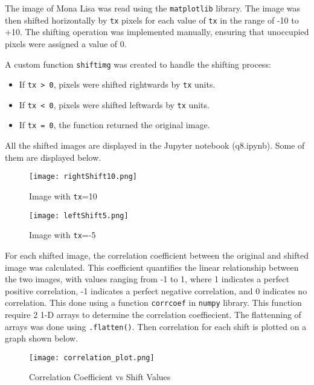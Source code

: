 \begin{tcolorbox}[breakable]
	\begin{sol}
		The image of Mona Lisa was read using the \texttt{matplotlib}
		library. The image was then shifted horizontally by \texttt{tx}
		pixels for each value of \texttt{tx} in the range of -10 to
		+10. The shifting operation was implemented manually, ensuring
		that unoccupied pixels were assigned a value of 0.

		A custom function \texttt{shiftimg} was created to handle the
		shifting process:
		\begin{itemize}
			\item If \texttt{tx > 0}, pixels were shifted
			      rightwards by \texttt{tx} units.
			\item If \texttt{tx < 0}, pixels were shifted leftwards
			      by \texttt{tx} units.
			\item If \texttt{tx = 0}, the function returned the
			      original image.
		\end{itemize}
		All the shifted images are displayed in the Jupyter notebook
		(q8.ipynb). Some of them are displayed below. \begin{figure}[H]
			\centering
			\begin{minipage}{0.345\textwidth}
				\centering
				\texttt{[image: rightShift10.png]}
				\caption{Image with \texttt{tx}=10}
				\label{fig:rightShift}
			\end{minipage}
			\begin{minipage}{0.35\textwidth}
				\centering
				\texttt{[image: leftShift5.png]}
				\caption{Image with \texttt{tx}=-5}
				\label{fig:leftShift}
			\end{minipage}
		\end{figure}


		For each shifted image, the correlation coefficient between the
		original and shifted image was calculated. This coefficient
		quantifies the linear relationship between the two images, with
		values ranging from -1 to 1, where 1 indicates a perfect
		positive correlation, -1 indicates a perfect negative
		correlation, and 0 indicates no correlation. This done using a
		function \texttt{corrcoef} in \texttt{numpy} library. This
		function require 2 1-D arrays to determine the correlation
		coeffiecient. The flattenning of arrays was done using
		\texttt{.flatten()}. Then correlation for each shift is plotted
		on a graph shown below.
		\begin{figure}[H]
			\centering
			\texttt{[image: correlation\_plot.png]}
			\caption{Correlation Coefficient vs Shift Values}
			\label{fig:corr_plot}
		\end{figure}



\end{sol}
\end{tcolorbox}

